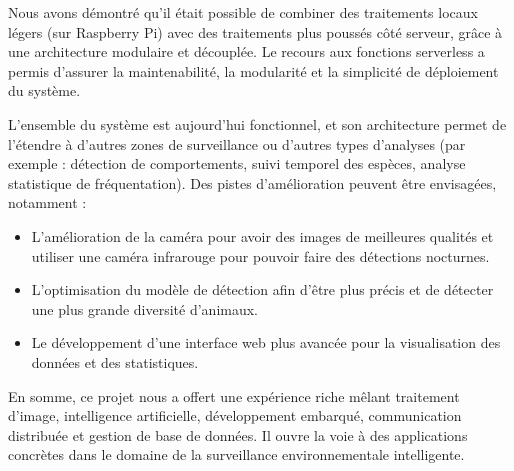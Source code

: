 \documentclass[a4paper,11pt]{article}
\begin{document}
	Nous avons démontré qu’il était possible de combiner des traitements locaux légers (sur Raspberry Pi) avec des traitements plus poussés côté serveur, grâce à une architecture modulaire et découplée. Le recours aux fonctions serverless a permis d’assurer la maintenabilité, la modularité et la simplicité de déploiement du système.
	
	L’ensemble du système est aujourd’hui fonctionnel, et son architecture permet de l’étendre à d’autres zones de surveillance ou d’autres types d’analyses (par exemple : détection de comportements, suivi temporel des espèces, analyse statistique de fréquentation). Des pistes d’amélioration peuvent être envisagées, notamment :
	
	\begin{itemize}
		\item L'amélioration de la caméra pour avoir des images de meilleures qualités et utiliser une caméra infrarouge pour pouvoir faire des détections nocturnes.
		\item L'optimisation du modèle de détection afin d'être plus précis et de détecter une plus grande diversité d'animaux.
		\item Le développement d’une interface web plus avancée pour la visualisation des données et des statistiques.\\
	\end{itemize}
	
	En somme, ce projet nous a offert une expérience riche mêlant traitement d’image, intelligence artificielle, développement embarqué, communication distribuée et gestion de base de données. Il ouvre la voie à des applications concrètes dans le domaine de la surveillance environnementale intelligente.
	
	
	
\end{document}
